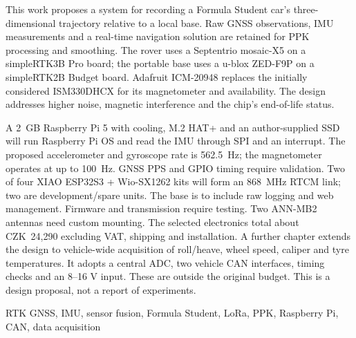 \begin{abstractEN}
This work proposes a system for recording a Formula Student car's
three-dimensional trajectory relative to a local base. Raw GNSS observations,
IMU measurements and a real-time navigation solution are retained for PPK
processing and smoothing. The rover uses a Septentrio mosaic-X5 on a
simpleRTK3B Pro board; the portable base uses a u-blox ZED-F9P on a
simpleRTK2B Budget board. Adafruit ICM-20948 replaces the initially
considered ISM330DHCX for its magnetometer and availability. The design
addresses higher noise, magnetic interference and the chip's end-of-life status.

A 2~GB Raspberry Pi 5 with cooling, M.2 HAT+ and an author-supplied SSD
will run Raspberry Pi OS and read the IMU through SPI and an interrupt.
The proposed accelerometer and gyroscope rate is \SI{562.5}{Hz}; the
magnetometer operates at up to \SI{100}{Hz}. GNSS PPS and GPIO timing
require validation. Two of four XIAO ESP32S3 + Wio-SX1262 kits will form
an 868~MHz RTCM link; two are development/spare units. The base is to
include raw logging and web management. Firmware and transmission require
testing. Two ANN-MB2 antennas need custom mounting. The selected electronics
total about CZK~24,290 excluding VAT, shipping and installation.
A further chapter extends the design to vehicle-wide acquisition of roll/heave,
wheel speed, caliper and tyre temperatures. It adopts a central ADC,
two vehicle CAN interfaces, timing checks and an 8--16 V input. These are outside
the original budget. This is a design proposal, not a report of experiments.
\end{abstractEN}

\begin{keywordsEN}
RTK GNSS, IMU, sensor fusion, Formula Student, LoRa, PPK, Raspberry Pi, CAN, data acquisition
\end{keywordsEN}
